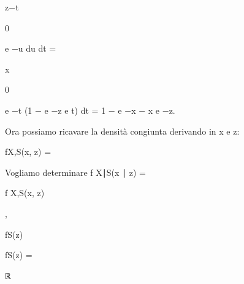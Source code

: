 \documentclass[a4paper,portrait,12pt]{article}
\begin{document}
\begin{flushleft}
z$-$t
\end{flushleft}


0





\begin{flushleft}
e $-$u du dt =
\end{flushleft}





\begin{flushleft}
x
\end{flushleft}


0





\begin{flushleft}
e $-$t (1 $-$ e $-$z e t) dt = 1 $-$ e $-$x $-$ x e $-$z.
\end{flushleft}





\begin{flushleft}
Ora possiamo ricavare la densit\`{a} congiunta derivando in x e z:
\end{flushleft}


\begin{flushleft}
fX,S(x, z) =
\end{flushleft}


\begin{flushleft}
Vogliamo determinare f X∣S(x ∣ z) =
\end{flushleft}





\begin{flushleft}
f X,S(x, z)
\end{flushleft}


,


\begin{flushleft}
fS(z)
\end{flushleft}





\begin{flushleft}
fS(z) =
\end{flushleft}





\begin{flushleft}
ℝ
\end{flushleft}
\end{document}
